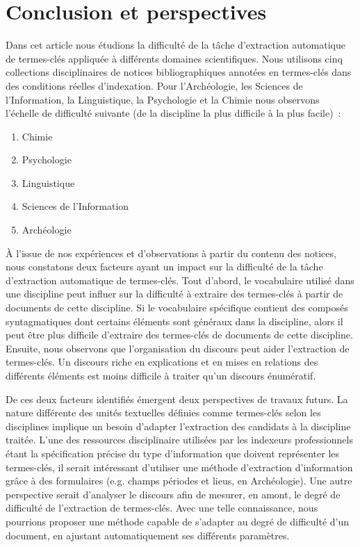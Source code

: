 \section{Conclusion et perspectives}
\label{sec:conclusion_et_perspectives}
  Dans cet article nous étudions la difficulté de la tâche d'extraction
  automatique de termes-clés appliquée à différents domaines scientifiques. Nous
  utilisons cinq collections disciplinaires de notices bibliographiques annotées
  en termes-clés dans des conditions réelles d'indexation. Pour l'Archéologie,
  les Sciences de l'Information, la Linguistique, la Psychologie et la Chimie
  nous observons l'échelle de difficulté suivante (de la discipline la plus
  difficile à la plus facile)~:
  \begin{enumerate}
    \item{Chimie}
    \item{Psychologie}
    \item{Linguistique}
    \item{Sciences de l'Information}
    \item{Archéologie}
  \end{enumerate}

  À l'issue de nos expériences et d'observations à partir du contenu des
  notices, nous constatons deux facteurs ayant un impact sur la difficulté de la
  tâche d'extraction automatique de termes-clés. Tout d'abord, le vocabulaire
  utilisé dans une discipline peut influer sur la difficulté à extraire des
  termes-clés à partir de documents de cette discipline. Si le vocabulaire
  spécifique contient des composés syntagmatiques dont certains éléments sont
  généraux dans la discipline, alors il peut être plus difficile
  d'extraire des termes-clés de documents de cette discipline. Ensuite, nous
  observons que l'organisation du discours peut aider l'extraction de
  termes-clés. Un discours riche en explications et en mises en relations des
  différents éléments est moins difficile à traiter qu'un discours énumératif.

  De ces deux facteurs identifiés émergent deux perspectives de travaux futurs.
  La nature différente des unités textuelles définies comme termes-clés selon
  les disciplines implique un besoin d'adapter l'extraction des candidats à la
  discipline traitée. L'une des ressources disciplinaire utilisées par les
  indexeurs professionnels étant la spécification précise du type d'information
  que doivent représenter les termes-clés, il serait intéressant d'utiliser une
  méthode d'extraction d'information grâce à des formulaires (e.g. champs
  périodes et lieus, en Archéologie). Une autre perspective serait d'analyser le
  discours afin de mesurer, en amont, le degré de difficulté de l'extraction de
  termes-clés. Avec une telle connaissance, nous pourrions proposer une méthode
  capable de s'adapter au degré de difficulté d'un document, en ajustant
  automatiquement ses différents paramètres.

